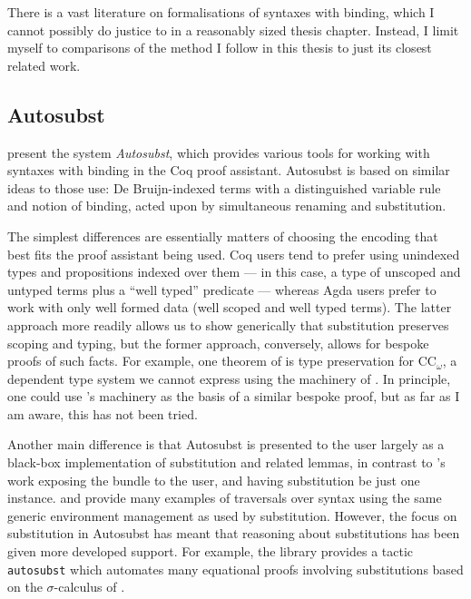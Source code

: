 There is a vast literature on formalisations of syntaxes with binding, which I
cannot possibly do justice to in a reasonably sized thesis chapter.
Instead, I limit myself to comparisons of the \citet{AACMM21} method I follow in
this thesis to just its closest related work.

\subsection{Autosubst}

\citet{Autosubst15} present the system \emph{Autosubst}, which provides various
tools for working with syntaxes with binding in the Coq proof assistant.
Autosubst is based on similar ideas to those \citeauthor{AACMM21} use:
De Bruijn-indexed terms with a distinguished variable rule and notion of
binding, acted upon by simultaneous renaming and substitution.

The simplest differences are essentially matters of choosing the encoding that
best fits the proof assistant being used.
Coq users tend to prefer using unindexed types and propositions indexed over
them --- in this case, a type of unscoped and untyped terms plus a
``well typed'' predicate --- whereas Agda users prefer to work with only well
formed data (well scoped and well typed terms).
The latter approach more readily allows us to show generically that substitution
preserves scoping and typing, but the former approach, conversely, allows for
bespoke proofs of such facts.
For example, one theorem of \citet{Autosubst15} is type preservation for
$\mathrm{CC}_\omega$, a dependent type system we cannot express using the
machinery of \citet{AACMM21}.
In principle, one could use \citeauthor{AACMM21}'s machinery as the basis of a
similar bespoke proof, but as far as I am aware, this has not been tried.

Another main difference is that Autosubst is presented to the user largely as
a black-box implementation of substitution and related lemmas, in contrast to
\citeauthor{AACMM21}'s work exposing the  bundle to the
user, and having substitution be just one instance.
\citet{ACMM17} and \citet{AACMM21} provide many examples of traversals over
syntax using the same generic environment management as used by substitution.
However, the focus on substitution in Autosubst has meant that reasoning about
substitutions has been given more developed support.
For example, the library provides a tactic \texttt{autosubst} which automates
many equational proofs involving substitutions based on the $\sigma$-calculus of
\citet{ACCL91}.

